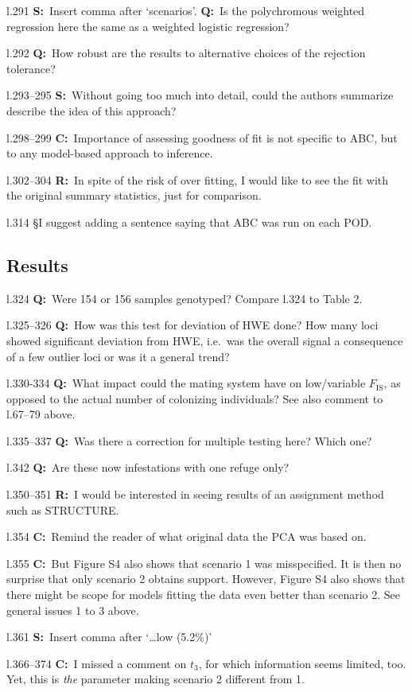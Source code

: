 \documentclass[11pt]{article}
\newenvironment{my_description}
{\begin{description}
  \setlength{\itemsep}{2pt}
  \setlength{\parskip}{0pt}
  \setlength{\parsep}{0pt}}
{\end{description}}
\newcommand{\C}{\textbf{C:}\ }
\newcommand{\Q}{\textbf{Q:}\ }
\newcommand{\R}{\textbf{R:}\ }
\newcommand{\V}{\textbf{S:}\ }
\begin{document}
\begin{my_description}
	\item[l.291] \V Insert comma after `scenarios'. \Q Is the polychromous weighted regression here the same as a weighted logistic regression?
	\item[l.292] \Q How robust are the results to alternative choices of the rejection tolerance?
	\item[l.293--295] \V Without going too much into detail, could the authors summarize describe the idea of this approach?
	\item[l.298--299] \C Importance of assessing goodness of fit is not specific to ABC, but to any model-based approach to inference.
	\item[l.302--304] \R In spite of the risk of over fitting, I would like to see the fit with the original summary statistics, just for comparison.
	\item[l.314] \S I suggest adding a sentence saying that ABC was run on each POD.
\end{my_description}


\subsection{Results}
\begin{my_description}
	\item[l.324] \Q Were 154 or 156 samples genotyped? Compare l.324 to Table 2.
	\item[l.325--326] \Q How was this test for deviation of HWE done? How many loci showed significant deviation from HWE, i.e.\ was the overall signal a consequence of a few outlier loci or was it a general trend?
	\item[l.330-334] \Q What impact could the mating system have on low/variable $F_{\mathrm{IS}}$, as opposed to the actual number of colonizing individuals? See also comment to l.67--79 above.
	\item[l.335--337] \Q Was there a correction for multiple testing here? Which one?
	\item[l.342] \Q Are these now infestations with one refuge only?
	\item[l.350--351] \R I would be interested in seeing results of an assignment method such as STRUCTURE.
	\item[l.354] \C Remind the reader of what original data the PCA was based on.
	\item[l.355] \C But Figure S4 also shows that scenario 1 was misspecified. It is then no surprise that only scenario 2 obtains support. However, Figure S4 also shows that there might be scope for models fitting the data even better than scenario 2. See general issues 1 to 3 above.
	\item[l.361] \V Insert comma after `\dots low (5.2\%)'
	\item[l.366--374] \C I missed a comment on $t_3$, for which information seems limited, too. Yet, this is \emph{the} parameter making scenario 2 different from 1.
	
\end{my_description}
\end{document}
